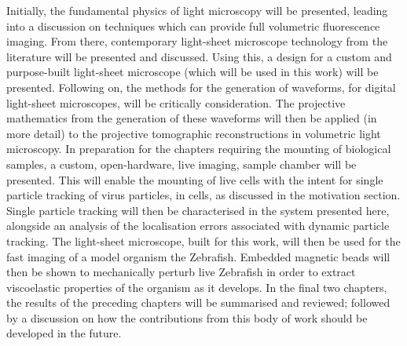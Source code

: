 Initially, the fundamental physics of light microscopy will be presented, leading into a discussion on techniques which can provide full volumetric fluorescence imaging.
From there, contemporary light-sheet microscope technology from the literature will be presented and discussed.
Using this, a design for a custom and purpose-built light-sheet microscope (which will be used in this work) will be presented.
Following on, the methods for the generation of waveforms, for digital light-sheet microscopes, will be critically consideration.
The projective mathematics from the generation of these waveforms will then be applied (in more detail) to the projective tomographic reconstructions in volumetric light microscopy.
In preparation for the chapters requiring the mounting of biological samples, a custom, open-hardware, live imaging, sample chamber will be presented.
This will enable the mounting of live cells with the intent for single particle tracking of virus particles, in cells, as discussed in the motivation section.
Single particle tracking will then be characterised in the system presented here, alongside an analysis of the localisation errors associated with dynamic particle tracking.
The light-sheet microscope, built for this work, will then be used for the fast imaging of a model organism the Zebrafish.
Embedded magnetic beads will then be shown to mechanically perturb live Zebrafish in order to extract viscoelastic properties of the organism as it develops.
In the final two chapters, the results of the preceding chapters will be summarised and reviewed; followed by a discussion on how the contributions from this body of work should be developed in the future.
